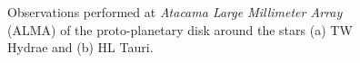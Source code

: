 

    \vfill
    \begin{figure}[h!]
        \centering
        \begin{minipage}{.5\linewidth}
            \centering
        \end{minipage}%
        \begin{minipage}{.5\linewidth}
            \centering
        \end{minipage}
        \caption{
            Observations performed at \textit{Atacama Large Millimeter Array} (ALMA) of 
            the proto-planetary disk around the stars (a) TW Hydrae and (b) HL Tauri. \\
            \vspace{2.5mm}
         }
        \label{fig:ppd_alma_observations}
    \end{figure}

